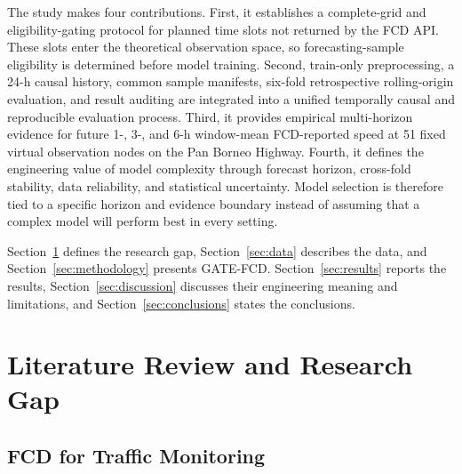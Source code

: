 \documentclass[pdflatex,sn-mathphys-num,iicol]{sn-jnl}
\begin{document}
The study makes four contributions. First, it establishes a complete-grid and eligibility-gating protocol for planned time slots not returned by the FCD API. These slots enter the theoretical observation space, so forecasting-sample eligibility is determined before model training. Second, train-only preprocessing, a 24-h causal history, common sample manifests, six-fold retrospective rolling-origin evaluation, and result auditing are integrated into a unified temporally causal and reproducible evaluation process. Third, it provides empirical multi-horizon evidence for future 1-, 3-, and 6-h window-mean FCD-reported speed at 51 fixed virtual observation nodes on the Pan Borneo Highway. Fourth, it defines the engineering value of model complexity through forecast horizon, cross-fold stability, data reliability, and statistical uncertainty. Model selection is therefore tied to a specific horizon and evidence boundary instead of assuming that a complex model will perform best in every setting.

Section~\ref{sec:literature} defines the research gap, Section~\ref{sec:data} describes the data, and Section~\ref{sec:methodology} presents GATE-FCD. Section~\ref{sec:results} reports the results, Section~\ref{sec:discussion} discusses their engineering meaning and limitations, and Section~\ref{sec:conclusions} states the conclusions.


\section{Literature Review and Research Gap}
\label{sec:literature}



\subsection{FCD for Traffic Monitoring}
\label{subsec:fcd-monitoring}
\end{document}

